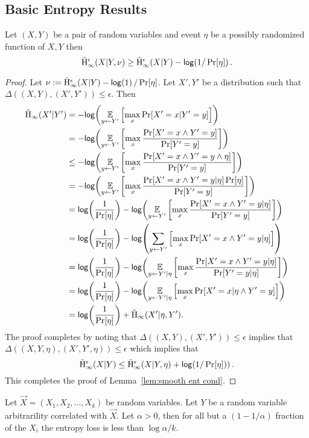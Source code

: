 \subsection{Basic Entropy Results}
\begin{lemma}
Let $(X, Y)$ be a pair of random variables and event $\eta$ be a possibly randomized function of $X, Y$ then 
\[
\tilde{\mathrm{H}}_\infty^\epsilon(X|Y, \nu)\ge \tilde{\mathrm{H}}_\infty^\epsilon(X|Y) - \mathsf{log}\!\left( 1/\Pr[\eta]\right).
\]
\label{lem:smooth ent cond}
\end{lemma}
\begin{proof}
Let $\nu := \tilde{\mathrm{H}}_\infty^\epsilon(X|Y) - \mathsf{log}\!\left(1\right)/\Pr[\eta]$.
Let $X', Y'$ be a distribution such that $\Delta((X, Y), (X', Y')) \le \epsilon$.  Then 
\begin{align*}
\Hav(X' | Y') &= -\log{\expe_{y\leftarrow Y'}\left[\max_{x} \Pr[X'=x | Y'=y]\right]}\\ 
&=-\log{\expe_{y\leftarrow Y'}\left[\max_{x} \frac{\Pr[X'=x \wedge Y'=y]}{\Pr[Y'=y]}\right]}\\
&\le-\log{\expe_{y\leftarrow Y'}\left[\max_{x} \frac{\Pr[X'=x \wedge Y'=y \wedge \eta]}{\Pr[Y'=y]}\right]}\\
&=-\log{\expe_{y\leftarrow Y'}\left[\max_{x} \frac{\Pr[X'=x \wedge Y'=y |\eta]\Pr[\eta]}{\Pr[Y'=y]}\right]}\\
&=\log{\frac{1}{\Pr[\eta]}}-\log{\expe_{y\leftarrow Y'}\left[\max_{x} \frac{\Pr[X'=x \wedge Y'=y |\eta]}{\Pr[Y'=y]}\right]}\\
&=\log{\frac{1}{\Pr[\eta]}}-\log{\sum_{y\leftarrow Y'}\left[\max_{x} \Pr[X'=x \wedge Y'=y |\eta]\right]}\\
&=\log{\frac{1}{\Pr[\eta]}}-\log{\expe_{y\leftarrow Y' | \eta}\left[\max_{x} \frac{\Pr[X'=x \wedge Y'=y |\eta]}{\Pr[Y'=y |\eta]}\right]}\\
&=\log{\frac{1}{\Pr[\eta]}}-\log{\expe_{y\leftarrow Y' | \eta}\left[\max_{x} \Pr[X'=x | \eta \wedge Y'=y ]\right]}\\
&=\log{\frac{1}{\Pr[\eta]}}+\Hav(X'| \eta, Y').
\end{align*}
The proof completes by noting that $\Delta((X, Y), (X', Y'))\le \epsilon$ implies that $\Delta((X, Y, \eta), (X', Y', \eta))\le \epsilon$ which implies that 
\[
\tilde{\mathrm{H}}_\infty^\epsilon(X| Y) \le \tilde{\mathrm{H}}_\infty^\epsilon(X|Y, \eta) +\mathsf{log}\!\left(1/\Pr[\eta])\right).
\]
This completes the proof of Lemma~\ref{lem:smooth ent cond}.
\end{proof}


\begin{lemma}{\cite[Lemma 2.2a]{dodis2008fuzzy}}
    \label{lem:markovpred}
    Let $\vec{X} = (X_1, X_2, \ldots, X_k)$ be random variables. Let $Y$ be a random variable arbitrarility correlated with $\vec{X}$. 
    Let $\alpha > 0$, then for all but a $(1-1/\alpha)$ fraction of the $X_i$ the entropy loss is less than $\log{\alpha}/k$. 
\end{lemma}

